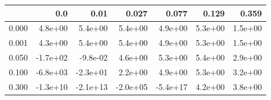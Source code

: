 \begin{tabular}{lrrrrrr}
\toprule
{} &      0.0 &     0.01 &    0.027 &    0.077 &   0.129 &   0.359 \\
\midrule
0.000 &  4.8e+00 &  5.4e+00 &  5.4e+00 &  4.9e+00 & 5.3e+00 & 1.5e+00 \\
0.001 &  4.3e+00 &  5.4e+00 &  5.4e+00 &  4.9e+00 & 5.3e+00 & 1.5e+00 \\
0.050 & -1.7e+02 & -9.8e-02 &  4.6e+00 &  5.3e+00 & 5.4e+00 & 2.9e+00 \\
0.100 & -6.8e+03 & -2.3e+01 &  2.2e+00 &  4.9e+00 & 5.3e+00 & 3.2e+00 \\
0.300 & -1.3e+10 & -2.1e+13 & -2.0e+05 & -5.4e+17 & 4.2e+00 & 3.8e+00 \\
\bottomrule
\end{tabular}
